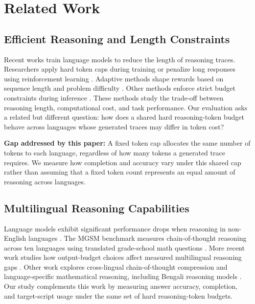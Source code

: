 \documentclass[11pt]{article}
\begin{document}
\section{Related Work}
\label{sec:related}

\subsection{Efficient Reasoning and Length Constraints}
\label{sec:related_cat1}

Recent works train language models to reduce the length of reasoning traces. Researchers apply hard token caps during training or penalize long responses using reinforcement learning \citep{aggarwal2025l1, hou2025thinkprune}. Adaptive methods shape rewards based on sequence length and problem difficulty \citep{liu2026laser, shorterbetter2025}. Other methods enforce strict budget constraints during inference \citep{muennighoff2025s1}. These methods study the trade-off between reasoning length, computational cost, and task performance. Our evaluation asks a related but different question: how does a shared hard reasoning-token budget behave across languages whose generated traces may differ in token cost? 

\noindent\textbf{Gap addressed by this paper:}
A fixed token cap allocates the same number of tokens to each language, regardless of how many tokens a generated trace requires. We measure how completion and accuracy vary under this shared cap rather than assuming that a fixed token count represents an equal amount of reasoning across languages.

\subsection{Multilingual Reasoning Capabilities}
\label{sec:related_cat2}

Language models exhibit significant performance drops when reasoning in non-English languages \citep{shi2022language, goyal2026mindthecap}. The MGSM benchmark measures chain-of-thought reasoning across ten languages using translated grade-school math questions \citep{shi2022language}. More recent work studies how output-budget choices affect measured multilingual reasoning gaps \citep{goyal2026mindthecap}. Other work explores cross-lingual chain-of-thought compression and language-specific mathematical reasoning, including Bengali reasoning models \citep{wan2026mcd, dipta2026ganitllm}. Our study complements this work by measuring answer accuracy, completion, and target-script usage under the same set of hard reasoning-token budgets.
\end{document}
